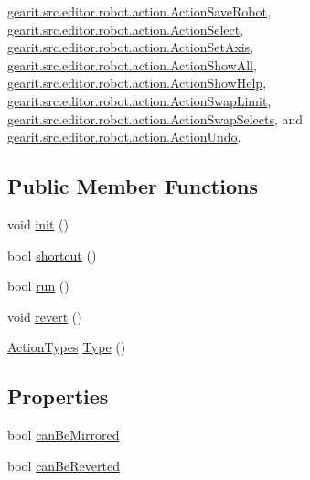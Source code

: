 \hyperlink{classgearit_1_1src_1_1editor_1_1robot_1_1action_1_1_action_save_robot}{gearit.\+src.\+editor.\+robot.\+action.\+Action\+Save\+Robot}, \hyperlink{classgearit_1_1src_1_1editor_1_1robot_1_1action_1_1_action_select}{gearit.\+src.\+editor.\+robot.\+action.\+Action\+Select}, \hyperlink{classgearit_1_1src_1_1editor_1_1robot_1_1action_1_1_action_set_axis}{gearit.\+src.\+editor.\+robot.\+action.\+Action\+Set\+Axis}, \hyperlink{classgearit_1_1src_1_1editor_1_1robot_1_1action_1_1_action_show_all}{gearit.\+src.\+editor.\+robot.\+action.\+Action\+Show\+All}, \hyperlink{classgearit_1_1src_1_1editor_1_1robot_1_1action_1_1_action_show_help}{gearit.\+src.\+editor.\+robot.\+action.\+Action\+Show\+Help}, \hyperlink{classgearit_1_1src_1_1editor_1_1robot_1_1action_1_1_action_swap_limit}{gearit.\+src.\+editor.\+robot.\+action.\+Action\+Swap\+Limit}, \hyperlink{classgearit_1_1src_1_1editor_1_1robot_1_1action_1_1_action_swap_selects}{gearit.\+src.\+editor.\+robot.\+action.\+Action\+Swap\+Selects}, and \hyperlink{classgearit_1_1src_1_1editor_1_1robot_1_1action_1_1_action_undo}{gearit.\+src.\+editor.\+robot.\+action.\+Action\+Undo}.

\subsection*{Public Member Functions}
\begin{DoxyCompactItemize}
\item 
void \hyperlink{interfacegearit_1_1src_1_1editor_1_1robot_1_1action_1_1_i_action_a06126a8dcc5caaf2bccfb4a926f30a7b}{init} ()
\item 
bool \hyperlink{interfacegearit_1_1src_1_1editor_1_1robot_1_1action_1_1_i_action_a419d5c457e2fce670b01f850f489dae9}{shortcut} ()
\item 
bool \hyperlink{interfacegearit_1_1src_1_1editor_1_1robot_1_1action_1_1_i_action_adce0830a403606993b9ec93b446522d1}{run} ()
\item 
void \hyperlink{interfacegearit_1_1src_1_1editor_1_1robot_1_1action_1_1_i_action_a4b56614ead417c692a05278130035e79}{revert} ()
\item 
\hyperlink{namespacegearit_1_1src_1_1editor_1_1robot_1_1action_a4be0fd46e3952d6135136b20e7b3fc5e}{Action\+Types} \hyperlink{interfacegearit_1_1src_1_1editor_1_1robot_1_1action_1_1_i_action_a8a84360c15fcd7d0f60ff7aef2dca980}{Type} ()
\end{DoxyCompactItemize}
\subsection*{Properties}
\begin{DoxyCompactItemize}
\item 
bool \hyperlink{interfacegearit_1_1src_1_1editor_1_1robot_1_1action_1_1_i_action_aac37cd50927ccf3cfadf24a7aeadca70}{can\+Be\+Mirrored}
\item 
bool \hyperlink{interfacegearit_1_1src_1_1editor_1_1robot_1_1action_1_1_i_action_a26e787190ad78f043987f4d8d0427b8f}{can\+Be\+Reverted}
\end{DoxyCompactItemize}


